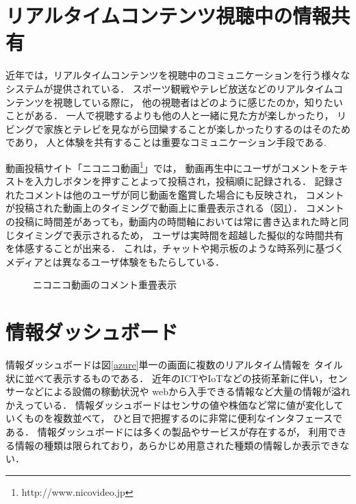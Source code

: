 \section{リアルタイムコンテンツ視聴中の情報共有}

近年では，リアルタイムコンテンツを視聴中のコミュニケーションを行う様々なシステムが提供されている．
スポーツ観戦やテレビ放送などのリアルタイムコンテンツを視聴している際に，
他の視聴者はどのように感じたのか，知りたいことがある．
一人で視聴するよりも他の人と一緒に見た方が楽しかったり，
リビングで家族とテレビを見ながら団欒することが楽しかったりするのはそのためであり，
人と体験を共有することは重要なコミュニケーション手段である.

動画投稿サイト「ニコニコ動画\footnote{http://www.nicovideo.jp}」では，
動画再生中にユーザがコメントをテキストを入力しボタンを押すことよって投稿され，投稿順に記録される．
記録されたコメントは他のユーザが同じ動画を鑑賞した場合にも反映され，
コメントが投稿された動画上のタイミングで動画上に重畳表示される（図\ref{niconico}）．
コメントの投稿に時間差があっても，動画内の時間軸においては常に書き込まれた時と同じタイミングで表示されるため，
ユーザは実時間を超越した擬似的な時間共有を体感することが出来る．
これは，チャットや掲示板のような時系列に基づくメディアとは異なるユーザ体験をもたらしている\cite{110006793374}．

\begin{figure}[H]
\centering
{}
\caption{ニコニコ動画のコメント重畳表示}
\label{niconico}
\end{figure}


\section{情報ダッシュボード}

情報ダッシュボードは図\ref{azure}単一の画面に複数のリアルタイム情報を
タイル状に並べて表示するものである\cite{few}\cite{few2005}．
近年のICTやIoTなどの技術革新に伴い，センサーなどによる設備の稼動状況や
webから入手できる情報など大量の情報が溢れかえっている．
情報ダッシュボードはセンサの値や株価など常に値が変化していくものを複数並べて，
ひと目で把握するのに非常に便利なインタフェースである．
情報ダッシュボードには多くの製品やサービスが存在するが，
利用できる情報の種類は限られており，あらかじめ用意された種類の情報しか表示できない．

